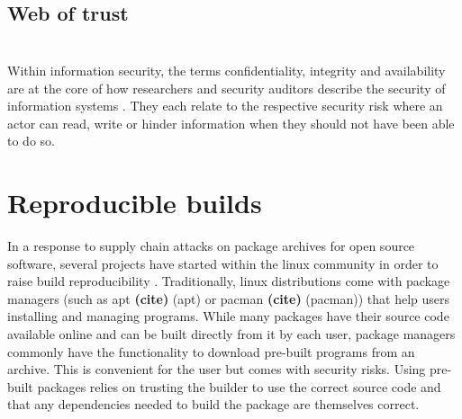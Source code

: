\documentclass[english, biblatex, digitaloutput]{kththesis}
\begin{document}
\subsection{}

\subsection{Web of trust}

\subsection{}

\subsection{}

\section{}

Within information security, the terms confidentiality, integrity and availability are at the core of how researchers and security auditors describe the security of information systems \cite{samonas_cia_nodate}. They each relate to the respective security risk where an actor can read, write or hinder information when they should not have been able to do so.

\section{Reproducible builds}

In a response to supply chain attacks on package archives for open source software, several projects have started within the linux community in order to raise build reproducibility \cite{reproducible_builds_project}. Traditionally, linux distributions come with package managers (such as apt \textbf{(cite)} (apt) or pacman \textbf{(cite)} (pacman)) that help users installing and managing programs. While many packages have their source code available online and can be built directly from it by each user, package managers commonly have the functionality to download pre-built programs from an archive. This is convenient for the user but comes with security risks. Using pre-built packages relies on trusting the builder to use the correct source code and that any dependencies needed to build the package are themselves correct.
\end{document}
